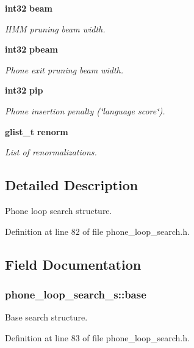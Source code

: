 \begin{DoxyCompactItemize}
{\bf int32} {\bf beam}
\begin{DoxyCompactList}\small\item\em \-H\-M\-M pruning beam width. \end{DoxyCompactList}\item 
{\bf int32} {\bf pbeam}
\begin{DoxyCompactList}\small\item\em \-Phone exit pruning beam width. \end{DoxyCompactList}\item 
{\bf int32} {\bf pip}
\begin{DoxyCompactList}\small\item\em \-Phone insertion penalty (\char`\"{}language score\char`\"{}). \end{DoxyCompactList}\item 
{\bf glist\-\_\-t} {\bf renorm}
\begin{DoxyCompactList}\small\item\em \-List of renormalizations. \end{DoxyCompactList}\end{DoxyCompactItemize}


\subsection{\-Detailed \-Description}
\-Phone loop search structure. 

\-Definition at line 82 of file phone\-\_\-loop\-\_\-search.\-h.



\subsection{\-Field \-Documentation}
\subsubsection[{base}]{ {\bf phone\-\_\-loop\-\_\-search\-\_\-s\-::base}}\label{structphone__loop__search__s_aea1cf9ffda814f681b57f32c1f8cc3b1}


\-Base search structure. 



\-Definition at line 83 of file phone\-\_\-loop\-\_\-search.\-h.

